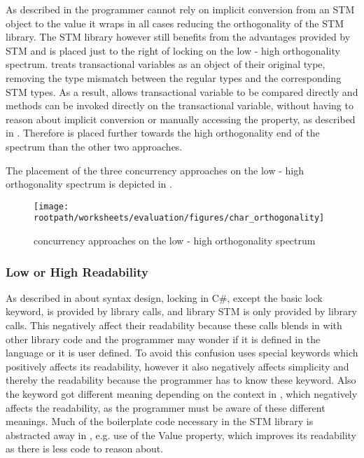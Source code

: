 As described in  the programmer cannot rely on implicit conversion from an \ac{STM} object to the value it wraps in all cases reducing the orthogonality of the \ac{STM} library. The \ac{STM} library however still benefits from the advantages provided by \ac{STM} and is placed just to the right of locking on the low - high orthogonality spectrum. \stmnamesp treats transactional variables as an object of their original type, removing the type mismatch between the regular types and the corresponding \ac{STM} types. As a result, \stmname allows transactional variable to be compared directly and methods can be invoked directly on the transactional variable, without having to reason about implicit conversion or manually accessing the  property, as described in . Therefore \stmname is placed further towards the high orthogonality end of the spectrum than the other two approaches.

The placement of the three concurrency approaches on the low - high orthogonality spectrum is depicted in .


\begin{figure}[htbp]
\centering
 \texttt{[image: \\rootpath/worksheets/evaluation/figures/char\_orthogonality]} 
 \caption{concurrency approaches on the low - high orthogonality spectrum}
\label{fig:char_orthogonality}
\end{figure}

\subsubsection{Low or High Readability}\label{subsec:char_readability}
As described in  about syntax design, locking in C\#, except the basic lock keyword, is provided by library calls, and library \ac{STM} is only provided by library calls. This negatively affect their readability because these calls blends in with other library code and the programmer may wonder if it is defined in the language or it is user defined. To avoid this confusion \stmname uses special keywords which positively affects its readability, however it also negatively affects simplicity and thereby the readability because the programmer has to know these keyword. Also the  keyword got different meaning depending on the context in \stmname, which negatively affects the readability, as the programmer must be aware of these different meanings. Much of the boilerplate code necessary in the \ac{STM} library is abstracted away in \stmname, e.g. use of the Value property, which improves its readability as there is less code to reason about.

